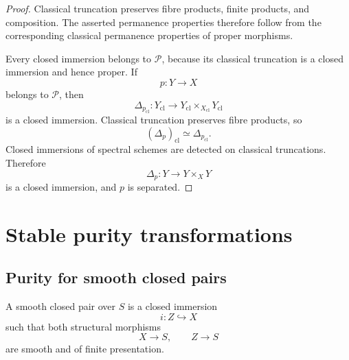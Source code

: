 \begin{proof}
Classical truncation preserves fibre products, finite products, and
composition.  The asserted permanence properties therefore follow from the
corresponding classical permanence properties of proper morphisms.

Every closed immersion belongs to \(\mathcal P\), because its classical
truncation is a closed immersion and hence proper.  If
\[
    p:Y\longrightarrow X
\]
belongs to \(\mathcal P\), then
\[
    \Delta_{p_{\mathrm{cl}}}:
    Y_{\mathrm{cl}}
    \longrightarrow
    Y_{\mathrm{cl}}\times_{X_{\mathrm{cl}}}Y_{\mathrm{cl}}
\]
is a closed immersion.  Classical truncation preserves fibre products, so
\[
    (\Delta_p)_{\mathrm{cl}}
    \simeq
    \Delta_{p_{\mathrm{cl}}}.
\]
Closed immersions of spectral schemes are detected on classical
truncations.  Therefore
\[
    \Delta_p:
    Y\longrightarrow Y\times_XY
\]
is a closed immersion, and \(p\) is separated.
\end{proof}

\section{Stable purity transformations}
\label{sec:stable-purity-transformations}

\subsection{Purity for smooth closed pairs}

\begin{definition}
\label{def:stable-smooth-closed-pair}
A smooth closed pair over \(S\) is a closed immersion
\[
    i:Z\hookrightarrow X
\]
such that both structural morphisms
\[
    X\longrightarrow S,
    \qquad
    Z\longrightarrow S
\]
are smooth and of finite presentation.
\end{definition}

